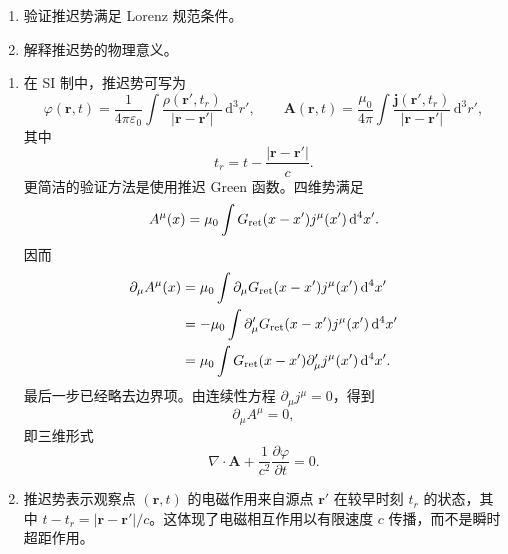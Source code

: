 \begin{question}[推迟势]
\begin{enumerate}
  \item 验证推迟势满足 Lorenz 规范条件。
  \item 解释推迟势的物理意义。
\end{enumerate}
\begin{solution}
\begin{enumerate}
  \item 在 SI 制中，推迟势可写为
  \[
    \varphi(\mathbf r,t)=\frac{1}{4\pi\varepsilon_0}\int
    \frac{\rho(\mathbf r',t_r)}{|\mathbf r-\mathbf r'|}\,\mathrm d^3r',
    \qquad
    \mathbf A(\mathbf r,t)=\frac{\mu_0}{4\pi}\int
    \frac{\mathbf j(\mathbf r',t_r)}{|\mathbf r-\mathbf r'|}\,\mathrm d^3r',
  \]
  其中
  \[
    t_r=t-\frac{|\mathbf r-\mathbf r'|}{c} .
  \]
  更简洁的验证方法是使用推迟 Green 函数。四维势满足
  \[
    A^\mu(x)=\mu_0\int G_{\rm ret}(x-x')j^\mu(x')\,\mathrm d^4x' .
  \]
  因而
  \[
  \begin{aligned}
    \partial_\mu A^\mu(x)
    &=\mu_0\int \partial_\mu G_{\rm ret}(x-x')j^\mu(x')\,\mathrm d^4x' \\
    &=-\mu_0\int \partial'_\mu G_{\rm ret}(x-x')j^\mu(x')\,\mathrm d^4x' \\
    &=\mu_0\int G_{\rm ret}(x-x')\partial'_\mu j^\mu(x')\,\mathrm d^4x' .
  \end{aligned}
  \]
  最后一步已经略去边界项。由连续性方程 $\partial_\mu j^\mu=0$，得到
  \[
    \partial_\mu A^\mu=0,
  \]
  即三维形式
  \[
    \nabla\cdot\mathbf A+\frac{1}{c^2}\frac{\partial\varphi}{\partial t}=0 .
  \]

  \item 推迟势表示观察点 $(\mathbf r,t)$ 的电磁作用来自源点 $\mathbf r'$ 在较早时刻 $t_r$ 的状态，其中 $t-t_r=|\mathbf r-\mathbf r'|/c$。这体现了电磁相互作用以有限速度 $c$ 传播，而不是瞬时超距作用。
\end{enumerate}
\end{solution}
\end{question}

